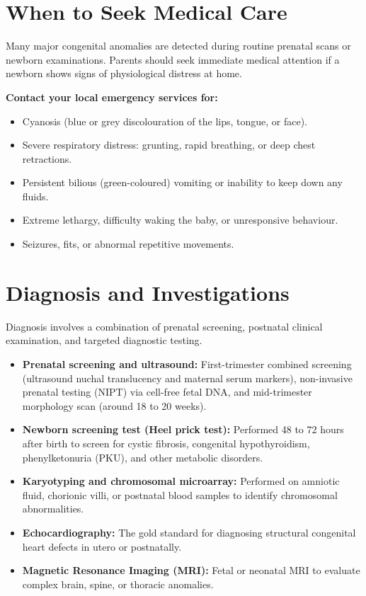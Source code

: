 \section*{When to Seek Medical Care}
Many major congenital anomalies are detected during routine prenatal scans or newborn examinations. Parents should seek immediate medical attention if a newborn shows signs of physiological distress at home.

\textbf{Contact your local emergency services for:}
\begin{itemize}
    \item Cyanosis (blue or grey discolouration of the lips, tongue, or face).
    \item Severe respiratory distress: grunting, rapid breathing, or deep chest retractions.
    \item Persistent bilious (green-coloured) vomiting or inability to keep down any fluids.
    \item Extreme lethargy, difficulty waking the baby, or unresponsive behaviour.
    \item Seizures, fits, or abnormal repetitive movements.
\end{itemize}

\section*{Diagnosis and Investigations}
Diagnosis involves a combination of prenatal screening, postnatal clinical examination, and targeted diagnostic testing.
\begin{itemize}
    \item \textbf{Prenatal screening and ultrasound:} First-trimester combined screening (ultrasound nuchal translucency and maternal serum markers), non-invasive prenatal testing (NIPT) via cell-free fetal DNA, and mid-trimester morphology scan (around 18 to 20 weeks).
    \item \textbf{Newborn screening test (Heel prick test):} Performed 48 to 72 hours after birth to screen for cystic fibrosis, congenital hypothyroidism, phenylketonuria (PKU), and other metabolic disorders.
    \item \textbf{Karyotyping and chromosomal microarray:} Performed on amniotic fluid, chorionic villi, or postnatal blood samples to identify chromosomal abnormalities.
    \item \textbf{Echocardiography:} The gold standard for diagnosing structural congenital heart defects in utero or postnatally.
    \item \textbf{Magnetic Resonance Imaging (MRI):} Fetal or neonatal MRI to evaluate complex brain, spine, or thoracic anomalies.
\end{itemize}

